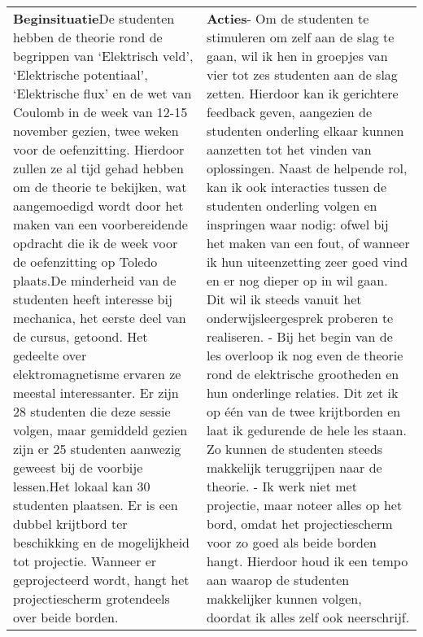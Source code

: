\begin{landscape}
	\begin{tabularx}{1.56\textwidth}{|p{}|X|}
		\hline
		\multirow{2}{0.55\textwidth}{\textbf{Beginsituatie}\newline De studenten hebben de theorie rond de  begrippen van `Elektrisch veld', `Elektrische potentiaal', `Elektrische flux' en de wet van Coulomb in de week van 12-15 november gezien, twee weken voor de oefenzitting. Hierdoor zullen ze al tijd gehad hebben om de theorie te bekijken, wat aangemoedigd wordt door het maken van een voorbereidende opdracht die ik de week voor de oefenzitting op Toledo plaats.\newline\newline De minderheid van de studenten heeft  interesse bij mechanica, het eerste deel van de cursus, getoond. Het gedeelte over elektromagnetisme ervaren ze meestal interessanter. Er zijn 28 studenten die deze sessie volgen, maar gemiddeld gezien zijn er 25 studenten aanwezig geweest bij de voorbije lessen.\newline\newline Het lokaal kan 30 studenten plaatsen. Er is een dubbel krijtbord ter beschikking en de mogelijkheid tot projectie. Wanneer er geprojecteerd wordt, hangt het projectiescherm grotendeels over beide borden.  }& \textbf{Acties}\newline  - Om de studenten te stimuleren om zelf aan de slag te gaan, wil ik hen in groepjes van vier tot zes studenten aan de slag zetten. Hierdoor kan ik gerichtere feedback geven, aangezien de studenten onderling elkaar kunnen aanzetten tot het vinden van oplossingen. Naast de helpende rol, kan ik ook interacties tussen de studenten onderling volgen en inspringen waar nodig: ofwel bij het maken van een fout, of wanneer ik hun uiteenzetting zeer goed vind en er nog dieper op in wil gaan. Dit wil ik steeds vanuit het onderwijsleergesprek proberen te realiseren.  \newline\newline
		- Bij het begin van de les overloop ik nog even de theorie rond de elektrische grootheden en hun onderlinge relaties. Dit zet ik op één van de twee krijtborden en laat ik gedurende de hele les staan. Zo kunnen de studenten steeds makkelijk teruggrijpen naar de theorie. \newline\newline
		- Ik werk niet met projectie, maar noteer alles op het bord, omdat het projectiescherm voor zo goed als beide borden hangt. Hierdoor houd ik een tempo aan waarop de studenten makkelijker kunnen volgen, doordat ik alles zelf ook neerschrijf.  
		

\end{tabularx}
\end{landscape}
